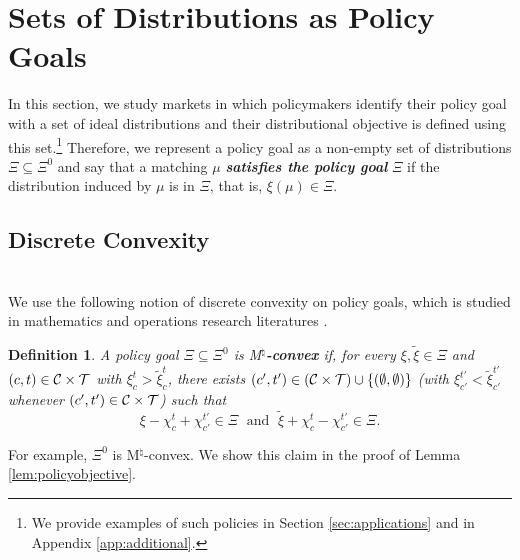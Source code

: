 \documentclass[12pt]{amsart}
\newtheorem{definition}{Definition}
\theoremstyle{remark}
\def\T{\mathcal{T}} \def\calt{\mathcal{T}}
\newcommand{\df}[1]{\textbf{\textit{#1}}}
\begin{document}



\section{Sets of Distributions as Policy Goals}\label{sec:alternative}
In this section, we study markets in which policymakers identify their policy goal with
a set of ideal distributions and their distributional objective is defined using this set.\footnote{We provide examples of such policies
in Section \ref{sec:applications} and in Appendix \ref{app:additional}.}
Therefore, we represent a policy goal as a non-empty set of distributions $\Xi\subseteq \Xi^0$ and
say that a matching $\mu$ \df{satisfies the policy goal} $\Xi$ if the distribution induced by $\mu$ is in $\Xi$, that is, $\xi(\mu) \in \Xi$.

\subsection{Discrete Convexity}\label{sec:convexity}\hfill\\
We use the following notion of discrete convexity on policy goals, which is studied in
mathematics and operations research literatures \citep{Murota:SIAM:2003}.

\begin{definition}\label{def:mnat}
A policy goal $\Xi\subseteq \Xi^0$ is M$^{\natural}$\textbf{-convex} if,
for every $\xi,\tilde{\xi} \in \Xi$ and $(c,t) \in \calc \times \calt$ with $\xi_c^t>\tilde{\xi}_c^t$,
there exists $(c',t') \in \left( \calc \times \calt \right) \cup \{(\emptyset,\emptyset)\}$
(with $\xi_{c'}^{t'}<\tilde{\xi}_{c'}^{t'}$ whenever $(c',t')\in \calc \times \calt$) such that
\[\xi-\chi_c^t+\chi_{c'}^{t'}\in \Xi \; \mbox{ and } \; \tilde{\xi}+\chi_c^t-\chi_{c'}^{t'} \in \Xi.\]
\end{definition}
For example, $\Xi^0$ is M$^{\natural}$-convex. We show this claim in the proof of Lemma \ref{lem:policyobjective}.

\begin{comment}
Following the discrete convex analysis literature, we let $\chi_{\emptyset}^{\emptyset} \in \mathbb N^{|\C|\times |\T|}$ be the
zero vector for notational convenience. Using this notation, M$^{\natural}$-convexity can be written as follows:
A set of distributions $\Xi \subseteq \Xi^0$ is M$^{\natural}$-convex if, for every
feasible distributions $\xi,\tilde{\xi} \in \Xi$ and $(c,t) \in \calc \times \calt$ with $\xi_c^t>\tilde{\xi}_c^t$,
there exists $(c',t') \in \left( \calc \times \calt \right) \cup \{(\emptyset,\emptyset)\}$
(with $\xi_{c'}^{t'}<\tilde{\xi}_{c'}^{t'}$ whenever $(c',t')\in \calc \times \calt$) such that
\[\xi-\chi_c^t+\chi_{c'}^{t'}\in \Xi \; \mbox{ and } \; \tilde{\xi}+\chi_c^t-\chi_{c'}^{t'} \in \Xi.\]
We use this notation in the rest of the paper.
\end{comment}
\end{document}
